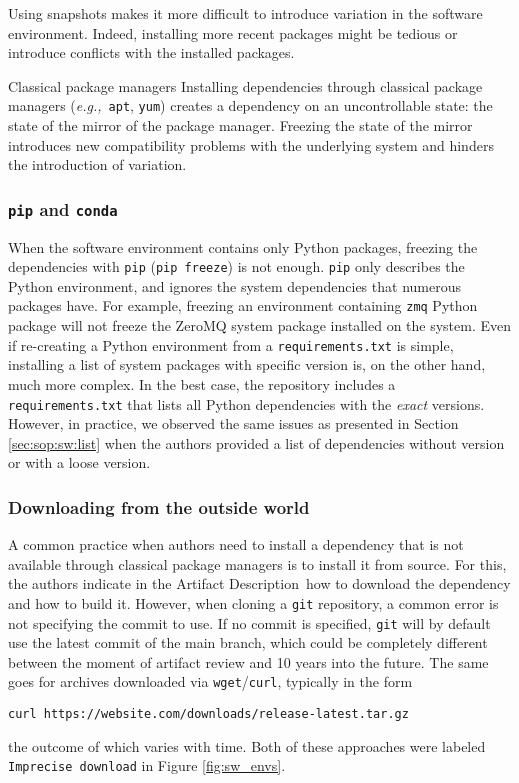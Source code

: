 \documentclass[sigconf,natbib=false]{acmart}
\newcommand{\eg}{\emph{e.g.,}}
\newcommand{\ad}{Artifact Description}
\begin{document}
Using snapshots makes it more difficult to introduce variation in the software environment.
Indeed, installing more recent packages might be tedious or introduce conflicts with the installed packages.

\begin{lesson}{Classical package managers}{}
  Installing dependencies through classical package managers (\eg\ \texttt{apt}, \texttt{yum}) creates a dependency on an uncontrollable state: the state of the mirror of the package manager.
  Freezing the state of the mirror introduces new compatibility problems with the underlying system and hinders the introduction of variation.
\end{lesson}

\subsubsection{\texttt{pip} and \texttt{conda}}

When the software environment contains only Python packages, freezing the dependencies with \texttt{pip} (\texttt{pip freeze}) is not enough.
\texttt{pip} only describes the Python environment, and ignores the system dependencies that numerous packages have. 
For example, freezing an environment containing \texttt{zmq} Python package will not freeze the ZeroMQ system package installed on the system.  
Even if re-creating a Python environment from a \texttt{requirements.txt} is simple, installing a list of system packages with specific version is, on the other hand, much more complex.
In the best case, the repository includes a \texttt{requirements.txt} that lists all Python dependencies with the \emph{exact} versions.
However, in practice, we observed the same issues as presented in Section \ref{sec:sop:sw:list} when the authors provided a list of dependencies without version or with a loose version.

\subsubsection{Downloading from the outside world}

A common practice when authors need to install a dependency that is not available through classical package managers is to install it from source.
For this, the authors indicate in the \ad\ how to download the dependency and how to build it.
However, when cloning a \texttt{git} repository, a common error is not specifying the commit to use.
If no commit is specified, \texttt{git} will by default use the latest commit of the main branch, which could be completely different between the moment of artifact review and 10 years into the future.
The same goes for archives downloaded via \texttt{wget}/\texttt{curl}, typically in the form
\begin{verbatim}
curl https://website.com/downloads/release-latest.tar.gz
\end{verbatim}
the outcome of which varies with time.
Both of these approaches were labeled \texttt{Imprecise download} in Figure \ref{fig:sw_envs}.
\end{document}

